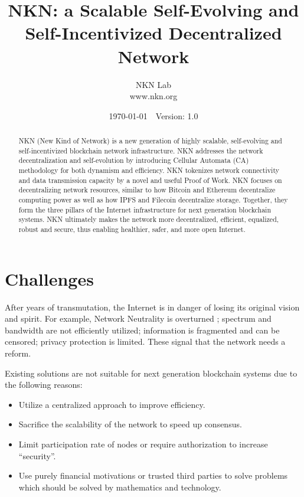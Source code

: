 \documentclass[reprint,pre,aps]{revtex4-1}
\begin{document}
\title{NKN: a Scalable Self-Evolving and Self-Incentivized Decentralized Network}

\author{NKN Lab\\www.nkn.org}
\noaffiliation

\date{\today\ \ Version: 1.0}


\begin{abstract}
NKN (New Kind of Network) is a new generation of highly scalable, self-evolving and self-incentivized blockchain network infrastructure. NKN addresses the network decentralization and self-evolution by introducing Cellular Automata (CA) methodology \cite{wolfram1983statistical, wolfram2002new} for both dynamism and efficiency. NKN tokenizes network connectivity and data transmission capacity by a novel and useful Proof of Work. NKN focuses on decentralizing network resources, similar to how Bitcoin \cite{nakamoto2008bitcoin} and Ethereum \cite{buterin2014next} decentralize computing power as well as how IPFS \cite{benet2014ipfs} and Filecoin\cite{filecoin} decentralize storage. Together, they form the three pillars of the Internet infrastructure for next generation blockchain systems. NKN ultimately makes the network more decentralized, efficient, equalized, robust and secure, thus enabling healthier, safer, and more open Internet.
\end{abstract}

\maketitle

\onecolumngrid

\vspace{-0.2in}

\tableofcontents

\clearpage

\twocolumngrid

\section{Challenges}

After years of transmutation, the Internet is in danger of losing its original vision and spirit. For example, Network Neutrality is overturned \cite{restore_internet_freedom}; spectrum and bandwidth are not efficiently utilized; information is fragmented and can be censored; privacy protection is limited. These signal that the network needs a reform.

Existing solutions are not suitable for next generation blockchain systems due to the following reasons:
\begin{itemize}
\item Utilize a centralized approach to improve efficiency.
\item Sacrifice the scalability of the network to speed up consensus.
\item Limit participation rate of nodes or require authorization to increase ``security''.
\item Use purely financial motivations or trusted third parties to solve problems which should be solved by mathematics and technology.
\end{itemize}
\end{document}
